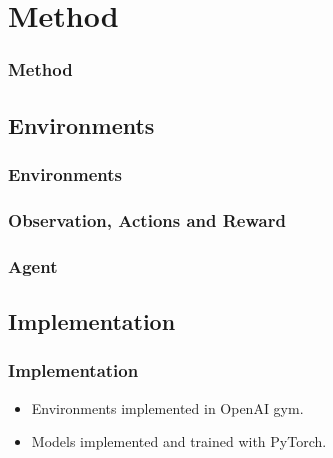 \section{Method}

\begin{frame}
    \frametitle{Method}

\end{frame}

\subsection{Environments}

\begin{frame}
    \frametitle{Environments}
\end{frame}

\begin{frame}
    \frametitle{Observation, Actions and Reward}
\end{frame}

\begin{frame}
    \frametitle{Agent}
\end{frame}

\subsection{Implementation}

\begin{frame}
    \frametitle{Implementation}

    \begin{itemize}
        \item Environments implemented in OpenAI gym.
        \item Models implemented and trained with PyTorch.
    \end{itemize}
\end{frame}